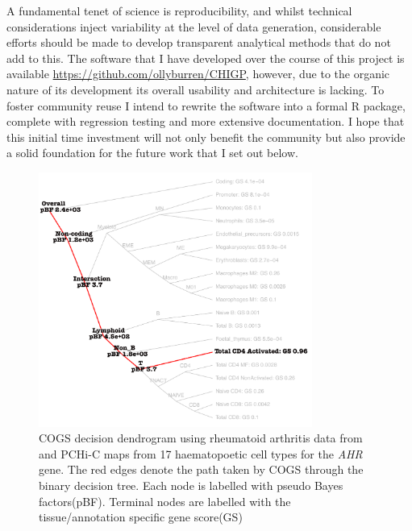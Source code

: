 \documentclass[a4paper,11pt]{report}
\begin{document}
A fundamental tenet of science is reproducibility, and whilst technical considerations inject variability at the level of data generation, considerable efforts should be made to develop transparent analytical methods that do not add to this. The software that I have developed over the course of this project is available \url{https://github.com/ollyburren/CHIGP}, however, due to the organic nature of its development its overall usability and architecture is lacking. To foster community reuse I intend to rewrite the software into a formal R package, complete with regression testing and more extensive documentation. I hope that this initial time investment will not only benefit the community but also provide a solid foundation for the future work that I set out below. 


\begin{figure}[ht]
\centering
\includegraphics[width=0.8\textwidth]{AHR_dend.pdf}
\caption{COGS decision dendrogram using rheumatoid arthritis data from \citet{Okada2014-um} and PCHi-C maps from 17 haematopoetic cell types for the \textit{AHR} gene. The red edges denote the path taken by COGS through the binary decision tree. Each node is labelled with pseudo Bayes factors(pBF). Terminal nodes are labelled with the tissue/annotation specific gene score(GS) }
\label{fig:AHR_dend}
\end{figure}
\end{document}
